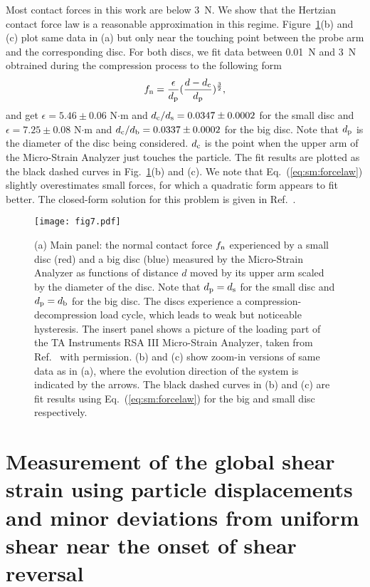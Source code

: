 \documentclass[twocolumn,showkeys,superscriptaddress,preprintnumbers,amsmath,amssymb,showpacs,prx,longbibliography]{revtex4-2}
\begin{document}
Most contact forces in this work are below 3~N. We show that the Hertzian contact force law is a reasonable approximation in this regime. Figure~\ref{fig:sm:forcelaw}(b) and (c) plot same data in (a) but only near the touching point between the probe arm and the corresponding disc. For both discs, we fit data between 0.01~N and 3~N obtrained during the compression process to the following form 
\begin{equation}\label{eq:sm:forcelaw}
        f_{\rm n}=\frac{\epsilon}{d_{\rm p}}(\frac{d-d_{\rm c}}{d_{\rm p}})^{\frac{3}{2}},
\end{equation}
and get $\epsilon=5.46\pm 0.06$ N$\cdot$m and $d_{\rm c}/d_{\rm s}=0.0347\pm 0.0002$ for the small disc and $\epsilon = 7.25\pm 0.08$ N$\cdot$m and $d_{\rm c}/d_{\rm b}=0.0337\pm 0.0002$ for the big disc. Note that $d_{\rm p}$ is the diameter of the disc being considered. $d_{\rm c}$ is the point when the upper arm of the Micro-Strain Analyzer just touches the particle. The fit results are plotted as the black dashed curves in Fig.~\ref{fig:sm:forcelaw}(b) and (c). We note that Eq.~(\ref{eq:sm:forcelaw}) slightly overestimates small forces, for which a quadratic form appears to fit better. The closed-form solution for this problem is given in Ref.~\cite{norden1973_report}.   

\begin{figure}[t]
    \centering
    \texttt{[image: fig7.pdf]}
    \caption{(a) Main panel: the normal contact force $f_{\rm n}$ experienced by a small disc (red) and a big disc (blue) measured by the Micro-Strain Analyzer as functions of distance $d$ moved by its upper arm scaled by the diameter of the disc. Note that $d_{\rm p}=d_{\rm s}$ for the small disc and $d_{\rm p}=d_{\rm b}$ for the big disc. 
    The discs experience a compression-decompression load cycle, which leads to weak but noticeable hysteresis. The insert panel shows a picture of the loading part of the TA Instruments RSA III Micro-Strain Analyzer, taken from Ref.~\cite{zhao2020_phd} with permission.
 (b) and (c) show zoom-in versions of same data as in (a), where the evolution direction of the system is indicated by the arrows. The black dashed curves in (b) and (c) are fit results using Eq.~(\ref{eq:sm:forcelaw}) for the big and small disc respectively.}
    \label{fig:sm:forcelaw}
\end{figure}


\section{Measurement of the global shear strain using particle displacements and minor deviations from uniform shear near the onset of shear reversal}\label{app_strain}
\end{document}
